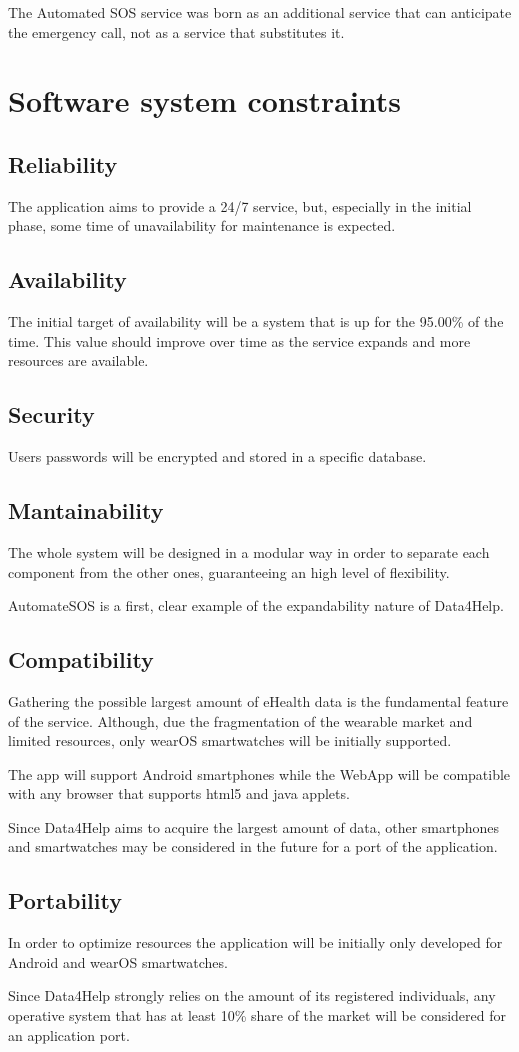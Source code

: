 The Automated SOS service was born as an additional service that can anticipate the emergency call, not as a service that substitutes it.


\section{Software system constraints}
\subsection{Reliability}
The application aims to provide a 24/7 service, but, especially in the initial phase, some time of unavailability for maintenance is expected.
\subsection{Availability}
The initial target of availability will be a system that is up for the 95.00\% of the time. This value should improve over time as the service expands and more resources are available.
\subsection{Security}
Users passwords will be encrypted and stored in a specific database.
\subsection{Mantainability}
The whole system will be designed in a modular way in order to separate each component from the other ones, guaranteeing an high level of flexibility. 

AutomateSOS is a first, clear example of the expandability nature of Data4Help.
\subsection{Compatibility}
Gathering the possible largest amount of eHealth data is the fundamental feature of the service. Although, due the fragmentation of the wearable market and limited resources, only wearOS smartwatches will be initially supported. 


The app will support Android smartphones while the WebApp will be compatible with any browser that supports html5 and java applets.


Since Data4Help aims to acquire the largest amount of data, other smartphones and smartwatches may be considered in the future for a port of the application.


\subsection{Portability}
In order to optimize resources the application will be initially only developed for Android and wearOS smartwatches.

Since Data4Help strongly relies on the amount of its registered individuals, any operative system that has at least 10\% share of the market will be considered for an application port.
